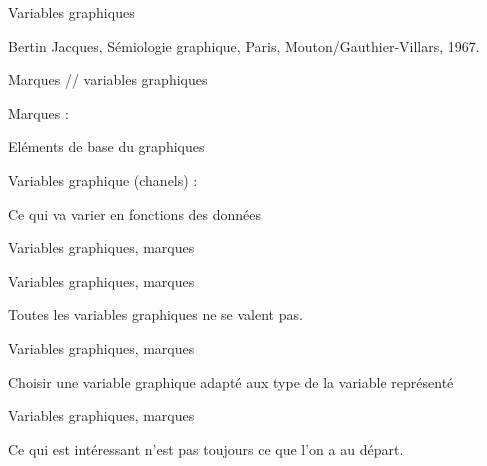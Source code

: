 \documentclass[ignorenonframetext,]{beamer}
\begin{document}
\begin{frame}{{Variables graphiques}}
\protect\hypertarget{variables-graphiques-1}{}

Bertin Jacques, Sémiologie graphique, Paris, Mouton/Gauthier-Villars,
1967.

\end{frame}

\begin{frame}{Marques // variables graphiques}
\protect\hypertarget{marques-variables-graphiques}{}

\begin{block}{Marques :}

Eléments de base du graphiques

\end{block}

\begin{block}{Variables graphique (chanels) :}

Ce qui va varier en fonctions des données

\end{block}

\end{frame}

\begin{frame}{{Variables graphiques, marques }}
\protect\hypertarget{variables-graphiques-marques}{}

\end{frame}

\begin{frame}{{Variables graphiques, marques }}
\protect\hypertarget{variables-graphiques-marques-1}{}

Toutes les variables graphiques ne se valent pas.

\end{frame}

\begin{frame}{{Variables graphiques, marques }}
\protect\hypertarget{variables-graphiques-marques-2}{}

{Choisir une variable graphique adapté aux type de la variable
représenté}

\end{frame}

\begin{frame}{{Variables graphiques, marques }}
\protect\hypertarget{variables-graphiques-marques-3}{}

Ce qui est intéressant n'est pas toujours ce que l'on a au départ.

\end{frame}
\end{document}
